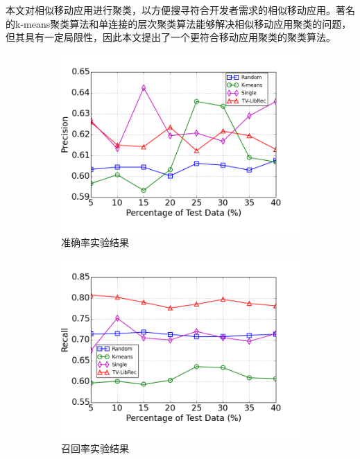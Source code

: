 本文对相似移动应用进行聚类，以方便搜寻符合开发者需求的相似移动应用。著名的k-means聚类算法和单连接的层次聚类算法能够解决相似移动应用聚类的问题，但其具有一定局限性，因此本文提出了一个更符合移动应用聚类的聚类算法。
\begin{figure}
	\centering
	\begin{subfigure}[b]{0.495\textwidth}
		\includegraphics[width=\textwidth]{figures/cluster_comp_p}
		\caption{准确率实验结果}
	\end{subfigure}
	\begin{subfigure}[b]{0.495\textwidth}
		\includegraphics[width=\textwidth]{figures/cluster_comp_r}
		\caption{召回率实验结果}
	\end{subfigure}
	\begin{subfigure}[b]{0.5\textwidth}

\end{subfigure}
\end{figure}
